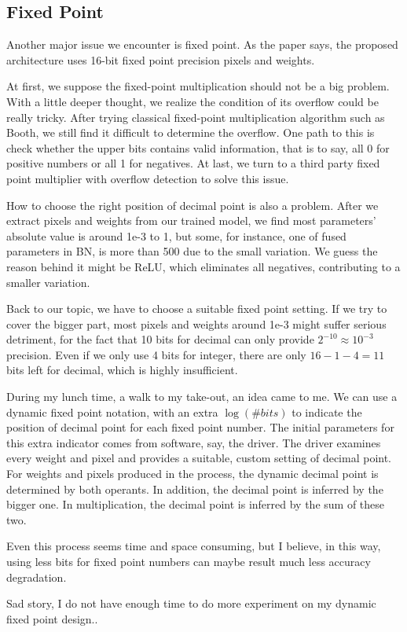 \subsection{Fixed Point}

Another major issue we encounter is fixed point. As the paper says, the proposed architecture uses 16-bit fixed point precision pixels and weights.

At first, we suppose the fixed-point multiplication should not be a big problem. With a little deeper thought, we realize the condition of its overflow could be really tricky. After trying classical fixed-point multiplication algorithm such as Booth, we still find it difficult to determine the overflow. One path to this is check whether the upper bits contains valid information, that is to say, all 0 for positive numbers or all 1 for negatives. At last, we turn to a third party fixed point multiplier with overflow detection to solve this issue.

How to choose the right position of decimal point is also a problem. After we extract pixels and weights from our trained model, we find most parameters' absolute value is around 1e-3 to 1, but some, for instance, one of fused parameters in BN, is more than 500 due to the small variation. We guess the reason behind it might be ReLU, which eliminates all negatives, contributing to a smaller variation.

Back to our topic, we have to choose a suitable fixed point setting. If we try to cover the bigger part, most pixels and weights around 1e-3 might suffer serious detriment, for the fact that 10 bits for decimal can only provide $2^{-10} \approx 10^{-3}$ precision. Even if we only use 4 bits for integer, there are only $16-1-4=11$ bits left for decimal, which is highly insufficient.

During my lunch time, a walk to my take-out, an idea came to me. We can use a dynamic fixed point notation, with an extra $\log(\#bits)$ to indicate the position of decimal point for each fixed point number. The initial parameters for this extra indicator comes from software, say, the driver. The driver examines every weight and pixel and provides a suitable, custom setting of decimal point. For weights and pixels produced in the process, the dynamic decimal point is determined by both operants. In addition, the decimal point is inferred by the bigger one. In multiplication, the decimal point is inferred by the sum of these two.

Even this process seems time and space consuming, but I believe, in this way, using less bits for fixed point numbers can maybe result much less accuracy degradation.

Sad story, I do not have enough time to do more experiment on my dynamic fixed point design..

